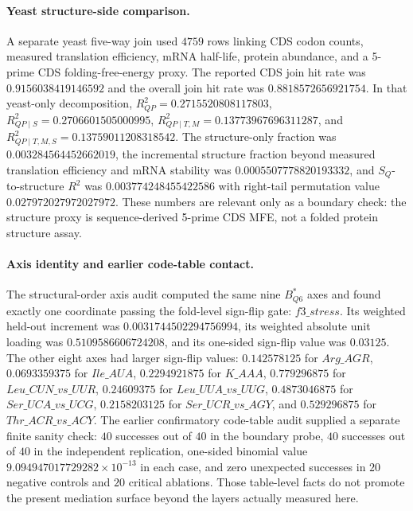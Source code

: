 \paragraph{Yeast structure-side comparison.}
A separate yeast five-way join used $4759$ rows linking CDS codon counts, measured translation efficiency, mRNA half-life, protein abundance, and a 5-prime CDS folding-free-energy proxy.  The reported CDS join hit rate was $0.9156038419146592$ and the overall join hit rate was $0.8818572656921754$.  In that yeast-only decomposition, $R^2_{QP}=0.2715520808117803$, $R^2_{QP\mid S}=0.2706601505000995$, $R^2_{QP\mid T,M}=0.13773967696311287$, and $R^2_{QP\mid T,M,S}=0.13759011208318542$.  The structure-only fraction was $0.003284564452662019$, the incremental structure fraction beyond measured translation efficiency and mRNA stability was $0.0005507778820193332$, and $S_Q$-to-structure $R^2$ was $0.003774248455422586$ with right-tail permutation value $0.027972027972027972$.  These numbers are relevant only as a boundary check: the structure proxy is sequence-derived 5-prime CDS MFE, not a folded protein structure assay.

\paragraph{Axis identity and earlier code-table contact.}
The structural-order axis audit computed the same nine $B^{\ast}_{Q6}$ axes and found exactly one coordinate passing the fold-level sign-flip gate: $f3\_stress$.  Its weighted held-out increment was $0.0031744502294756994$, its weighted absolute unit loading was $0.5109586606724208$, and its one-sided sign-flip value was $0.03125$.  The other eight axes had larger sign-flip values: $0.142578125$ for $Arg\_AGR$, $0.0693359375$ for $Ile\_AUA$, $0.2294921875$ for $K\_AAA$, $0.779296875$ for $Leu\_CUN\_vs\_UUR$, $0.24609375$ for $Leu\_UUA\_vs\_UUG$, $0.4873046875$ for $Ser\_UCA\_vs\_UCG$, $0.2158203125$ for $Ser\_UCR\_vs\_AGY$, and $0.529296875$ for $Thr\_ACR\_vs\_ACY$.  The earlier confirmatory code-table audit supplied a separate finite sanity check: $40$ successes out of $40$ in the boundary probe, $40$ successes out of $40$ in the independent replication, one-sided binomial value $9.094947017729282\times 10^{-13}$ in each case, and zero unexpected successes in $20$ negative controls and $20$ critical ablations.  Those table-level facts do not promote the present mediation surface beyond the layers actually measured here.

